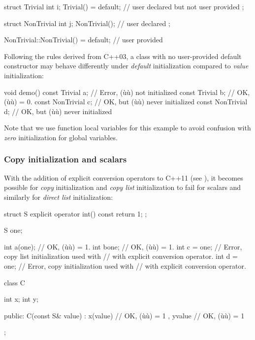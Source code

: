 \begin{emcppslisting}[emcppsbatch=e16]
struct Trivial
{
    int i;
    Trivial() = default;            // user declared but not user provided
};

struct NonTrivial
{
    int j;
    NonTrivial();                    // user declared
};

NonTrivial::NonTrivial() = default;  // user provided
\end{emcppslisting}
    

\noindent Following the rules derived from C++03, a class with no user-provided
default constructor may behave differently under \emph{default}
initialization compared to \emph{value} initialization:

\begin{emcppslisting}[emcppsbatch=e16]
void demo()
{
    const Trivial    a;    // Error, (ù{}ù) not initialized
    const Trivial    b{};  // OK, (ù{}ù) = 0.
    const NonTrivial c;    // OK, but (ù{}ù) never initialized
    const NonTrivial d{};  // OK, but (ù{}ù) never initialized
}
\end{emcppslisting}
    

\noindent Note that we use function local variables for this example to avoid
confusion with \emph{zero} initialization for global variables.

\subsubsection[Copy initialization and scalars]{Copy initialization and scalars}\label{copy-initialization-and-scalars}

With the addition of explicit conversion operators to C++11 (see ), it becomes possible for \emph{copy}
initialization and \emph{copy list} initialization to fail for scalars
and similarly for \emph{direct list} initialization:

\begin{emcppslisting}
struct S
{
    explicit operator int() const { return 1; }
};

S one{};

int a(one);     // OK, (ù{}ù) = 1.
int b{one};     // OK, (ù{}ù) = 1.
int c = {one};  // Error, copy list initialization used with
                // with explicit conversion operator.
int d = one;    // Error, copy initialization used with
                // with explicit conversion operator.

class C {
    int x;
    int y;

public:
    C(const S& value) : x(value)  // OK, (ù{}ù) = 1
                      , y{value}  // OK, (ù{}ù) = 1
    {
    }
};
\end{emcppslisting}
    

